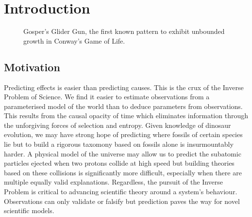 \chapter{Introduction}

\begin{figure}[!h]
\centering
            \hfill
            \hfill
            \hfill
            \hfill
            \caption{Gosper's Glider Gun, the first known pattern to exhibit unbounded growth in Conway's Game of Life.\cite{hickerson}}
\label{fig:gospers-glider}
\end{figure}

\section{Motivation}
Predicting effects is easier than predicting causes. This is the crux of the Inverse Problem of Science. We find it easier to estimate observations from a parameterised model of the world than to deduce parameters from observations. This results from the causal opacity of time which eliminates information through the unforgiving forces of selection and entropy. Given knowledge of dinosaur evolution, we may have strong hope of predicting where fossils of certain species lie but to build a rigorous taxomony based on fossils alone is insurmountably harder. A physical model of the universe may allow us to predict the subatomic particles ejected when two protons collide at high speed but building theories based on these collisions is significantly more difficult, especially when there are multiple equally valid explanations. Regardless, the pursuit of the Inverse Problem is critical to advancing scientific theory around a system's behaviour. Observations can only validate or falsify but prediction paves the way for novel scientific models.\\

